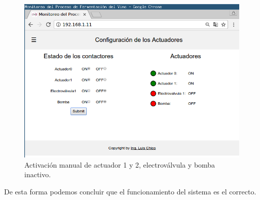 \begin{figure}[h]
  \centering
  \includegraphics[scale=.25]{./Figures/test_contact.png}
  \caption{Activación manual de actuador 1 y 2, electroválvula y bomba inactivo.}
  \label{fig:test_contact}
\end{figure}


De esta forma podemos concluir que el funcionamiento del sistema es el correcto.






